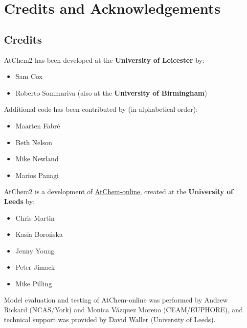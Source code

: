 %
%
%
%

\chapter{Credits and Acknowledgements} \label{ch:credits}

\section{Credits} \label{sec:credits}

AtChem2 has been developed at the \textbf{University of Leicester} by:

\begin{itemize}
\item Sam Cox
\item Roberto Sommariva (also at the \textbf{University of Birmingham})
\end{itemize}

\noindent
Additional code has been contributed by (in alphabetical order):

\begin{itemize}
\item Maarten Fabr{\'e}
\item Beth Nelson
\item Mike Newland
\item Marios Panagi
\end{itemize}

AtChem2 is a development of
\href{https://atchem.leeds.ac.uk/webapp/}{AtChem-online},
created at the \textbf{University of Leeds} by:

\begin{itemize}
\item Chris Martin
\item Kasia Boro{\'n}ska
\item Jenny Young
\item Peter Jimack
\item Mike Pilling
\end{itemize}

Model evaluation and testing of AtChem-online was performed by Andrew
Rickard (NCAS/York) and Monica V{\'a}zquez Moreno (CEAM/EUPHORE), and
technical support was provided by David Waller (University of Leeds).

